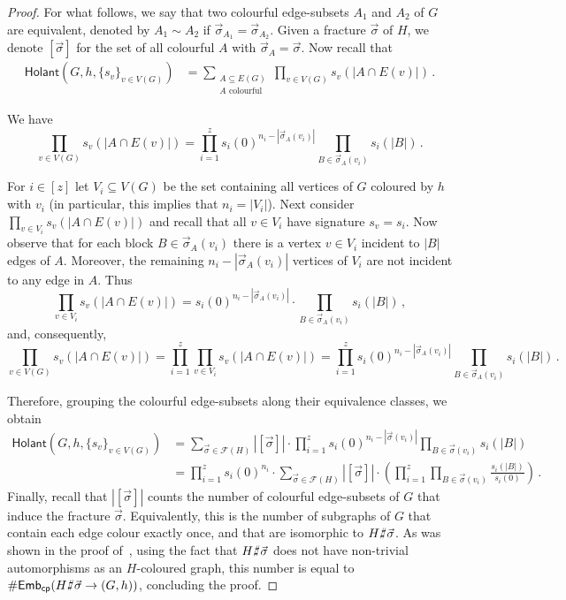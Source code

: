 \documentclass[authorcolumns,numberwithinsect]{no-lipics-v2022}
\def\fracture#1#2{\ensuremath{#1\raisebox{.2ex}{\rotatebox[origin=c]{-15}{$\sharp$}}#2}}
\newcommand{\embscp}{\mathsf{Emb}_{\mathsf{cp}}}
\newcommand{\holant}{\mathsf{Holant}}
\def\fracture#1#2{\ensuremath{#1\raisebox{.2ex}{\rotatebox[origin=c]{-15}{$\sharp$}}#2}}
\begin{document}
\begin{proof}
    For what follows, we say that two colourful edge-subsets $A_1$ and $A_2$ of $G$ are equivalent, denoted by $A_1\sim A_2$ if $\vec{\sigma}_{A_1} = \vec{\sigma}_{A_2}$. Given a fracture $\vec{\sigma}$ of $H$, we denote $[\vec{\sigma}]$ for the set of all colourful $A$ with $\vec{\sigma}_{A} = \vec{\sigma}$.
    Now recall that
    \begin{align*}
        \holant(G,h,\{s_v\}_{v\in V(G)}) &= \sum_{\substack{A \subseteq E(G)\\ A\text{ colourful}}} \prod_{v\in V(G)} s_v(|A \cap E(v)|)\,.
    \end{align*}
    \begin{claim}
        We have
        \[ \prod_{v\in V(G)} s_v(|A \cap E(v)|) = \prod_{i=1}^z s_i(0)^{n_i - |\vec{\sigma}_A(v_i)|} \prod_{B\in \vec{\sigma}_A(v_i)} s_i(|B|)  \,.\]
    \end{claim}
    \begin{claimproof}
        For $i\in[z]$ let $V_i\subseteq V(G)$ be the set containing all vertices of $G$ coloured by $h$ with $v_i$ (in particular, this implies that $n_i=|V_i|$). Next consider $ \prod_{v\in V_i} s_v(|A \cap E(v)|)$ and recall that  all $v\in V_i$ have signature $s_v = s_i$. Now observe that for each block $B\in \vec{\sigma}_A(v_i)$ there is a vertex $v\in V_i$ incident to $|B|$ edges of $A$. Moreover, the remaining $n_i-|\vec{\sigma}_A(v_i)|$ vertices of $V_i$ are not incident to any edge in $A$. Thus
        \[\prod_{v\in V_i} s_v(|A \cap E(v)|) = s_i(0)^{n_i-|\vec{\sigma}_A(v_i)|} \cdot \prod_{B\in \vec{\sigma}_A(v_i)} s_i(|B|)\,,\]
        and, consequently,
        \[\prod_{v\in V(G)} s_v(|A \cap E(v)|) = \prod_{i=1}^z \prod_{v\in V_i} s_v(|A \cap E(v)|) = \prod_{i=1}^z s_i(0)^{n_i - |\vec{\sigma}_A(v_i)|} \prod_{B\in \vec{\sigma}_A(v_i)} s_i(|B|)\,. \]
    \end{claimproof}
    Therefore, grouping the colourful edge-subsets along their equivalence classes, we obtain
    \begin{align*}
        \holant(G,h,\{s_v\}_{v\in V(G)}) &= \sum_{\vec{\sigma}\in \mathcal{F}(H)} |[\vec{\sigma}]| \cdot \prod_{i=1}^z s_i(0)^{n_i - |\vec{\sigma}(v_i)|} \prod_{B\in \vec{\sigma}(v_i)} s_i(|B|)\\
        ~&= \prod_{i=1}^z s_i(0)^{n_i} \cdot \sum_{\vec{\sigma}\in \mathcal{F}(H)} |[\vec{\sigma}]| \cdot \left(\prod_{i=1}^z \prod_{B \in \vec{\sigma}(v_i)} \frac{s_i(|B|)}{s_i(0)}  \right) \,.
    \end{align*}
    Finally, recall that $|[\vec{\sigma}]|$ counts the number of colourful edge-subsets of $G$ that induce the fracture $\vec{\sigma}$. Equivalently, this is the number of subgraphs of $G$ that contain each edge colour exactly once, and that are isomorphic to $\fracture{H}{\vec{\sigma}}$. As was shown in the proof of~\cite[Lemma 4.1]{PeyerimhoffRSSVW23}, using the fact that $\fracture{H}{\vec{\sigma}}$ does not have non-trivial automorphisms as an $H$-coloured graph, this number is equal to $\#\embscp(\fracture{H}{\vec{\sigma}} \to (G,h))$, concluding the proof.
\end{proof}
\end{document}

